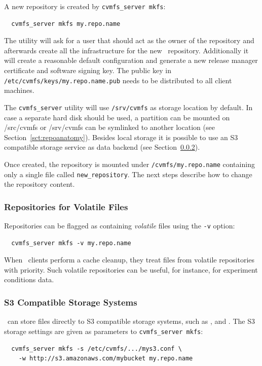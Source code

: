 A new repository is created by \texttt{cvmfs\_server mkfs}:
\begin{verbatim}
  cvmfs_server mkfs my.repo.name
\end{verbatim}
The utility will ask for a user that should act as the owner of the repository and afterwards create all the infrastructure for the new \cvmfs\ repository.
Additionally it will create a reasonable default configuration and generate a new release manager certificate and software signing key.
The public key in \texttt{/etc/cvmfs/keys/my.repo.name.pub} needs to be distributed to all client machines.

The \texttt{cvmfs\_server} utility will use \texttt{/srv/cvmfs} as storage location by default.
In case a separate hard disk should be used, a partition can be mounted on /src/cvmfs or /srv/cvmfs can be symlinked to another location (see Section~\ref{sct:repoanatomy}).
Besides local storage it is possible to use an S3 compatible storage service as data backend (see Section~\ref{sct:s3storagesetup}).

Once created, the repository is mounted under \texttt{/cvmfs/my.repo.name} containing only a single file called \texttt{new\_repository}.
The next steps describe how to change the repository content.

\subsubsection{Repositories for Volatile Files}
Repositories can be flagged as containing \emph{volatile} files using the \texttt{-v} option:
\begin{verbatim}
  cvmfs_server mkfs -v my.repo.name
\end{verbatim}
When \cvmfs\ clients perform a cache cleanup, they treat files from volatile repositories with priority.
Such volatile repositories can be useful, for instance, for experiment conditions data.

\subsubsection{S3 Compatible Storage Systems}
\label{sct:s3storagesetup}

\cvmfs\ can store files directly to S3 compatible storage systems, such as ,  and .
The S3 storage settings are given as parameters to \texttt{cvmfs\_server mkfs}:
\begin{verbatim}
  cvmfs_server mkfs -s /etc/cvmfs/.../mys3.conf \
    -w http://s3.amazonaws.com/mybucket my.repo.name
\end{verbatim}

